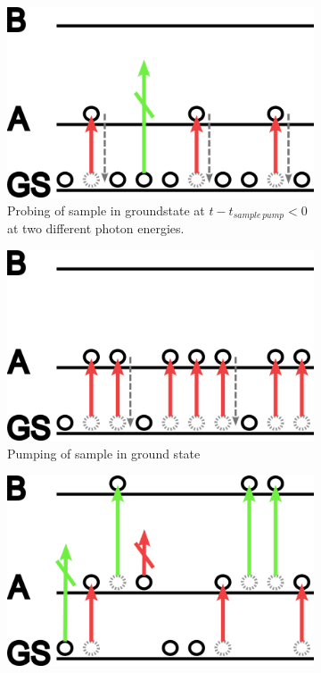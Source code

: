 \documentclass[twoside,openright]{scrreprt}
\begin{document}
\begin{figure}[hbtp]
\centering
\begin{subfigure}[t]{0.3\textwidth}
\centering
\includegraphics[width=\linewidth]{images/TA-explanationProbeOnly.png}
\caption{Probing of sample in groundstate at $t-t_{sample\, pump} < 0$ at two different photon energies.\label{fig:probeOnly}}
\end{subfigure}
\hfill
\begin{subfigure}[t]{0.3\textwidth}
\centering
\includegraphics[width=\linewidth]{images/TA-explanationPumpOnly.png}
\caption{Pumping of sample in ground state}
\end{subfigure}
\hfill
\begin{subfigure}[t]{0.3\textwidth}
\centering
\includegraphics[width=\linewidth]{images/TA-explanation-probe-after-pump.png}

\end{subfigure}
\end{figure}
\end{document}
